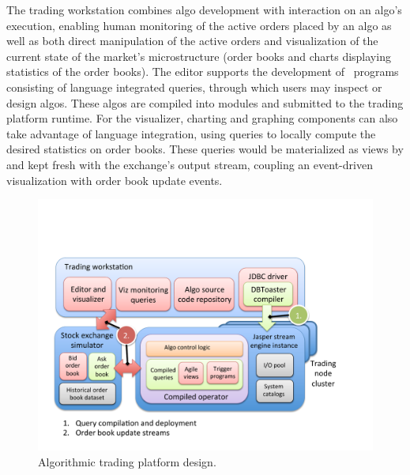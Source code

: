 The trading workstation combines algo development with interaction on an algo's
execution, enabling human monitoring of the active orders placed by an algo as
well as both direct manipulation of the active orders and visualization of the
current state of the market's microstructure (order books and charts displaying
statistics of the order books). The editor supports the development of
\targetlang\ programs consisting of language integrated queries, through which
users may inspect or design algos. These algos are compiled into modules and
submitted to the trading platform runtime. For the visualizer, charting and
graphing components can also take advantage of language integration, using
queries to locally compute the desired statistics on order books. These queries
would be materialized as views by \compiler and kept fresh with the exchange's
output stream, coupling an event-driven visualization with order book update
events.

\begin{figure}[htbp]
\begin{center}
\includegraphics[scale=0.38]{figures/algo-arch}
\end{center}
\label{fig:algarch}
\vspace{-5mm}
\caption{Algorithmic trading platform design.}
\end{figure}


